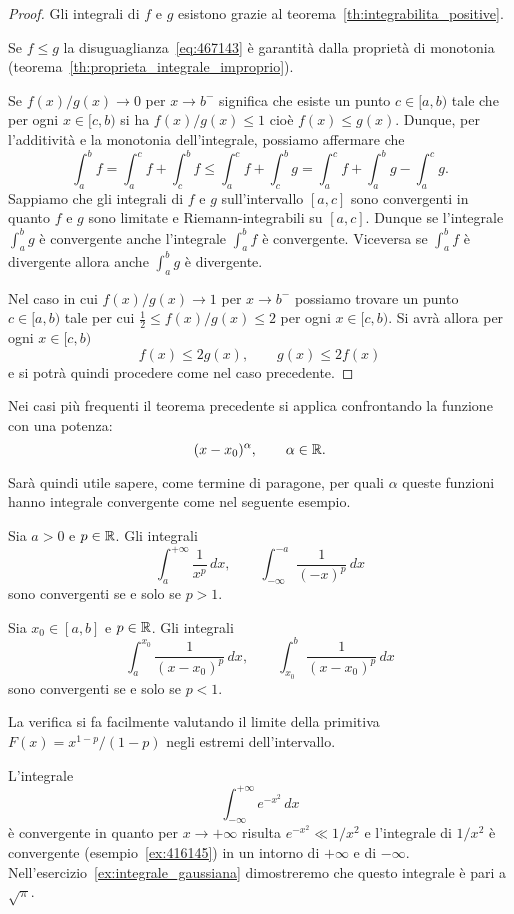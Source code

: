 \begin{proof}
\mymark{**}
Gli integrali di $f$ e $g$ esistono grazie al teorema~\ref{th:integrabilita_positive}.

Se $f\le g$ la disuguaglianza~\eqref{eq:467143} è garantità dalla proprietà di monotonia
(teorema~\ref{th:proprieta_integrale_improprio}).

Se $f(x)/g(x) \to 0$ per $x\to b^-$ significa che esiste un punto $c\in[a,b)$
tale che per ogni $x\in [c,b)$ si ha $f(x)/g(x)\le 1$ cioè $f(x)\le g(x)$.
Dunque, per l'additività e la monotonia dell'integrale, possiamo affermare che
\[
  \int_a^b f
  = \int_a^c f + \int_c^b f
  \le \int_a^c f + \int_c^b g
  = \int_a^c f + \int_a^b g - \int_a^c g.
\]
Sappiamo che gli integrali di $f$ e $g$ sull'intervallo
$[a,c]$ sono convergenti in quanto $f$ e $g$ sono
limitate e Riemann-integrabili su $[a,c]$.
Dunque se l'integrale $\int_a^b g$ è convergente anche l'integrale
$\int_a^b f$ è convergente.
Viceversa se $\int_a^b f$ è divergente allora anche $\int_a^b g$ è divergente.

Nel caso in cui $f(x)/g(x)\to 1$ per $x\to b^-$ possiamo trovare
un punto $c\in[a,b)$ tale per cui $\frac 1 2 \le f(x)/g(x) \le 2$
per ogni $x\in [c,b)$. Si avrà allora per ogni $x\in [c,b)$
\[
f(x) \le 2g(x), \qquad g(x) \le 2 f(x)
\]
e si potrà quindi procedere come nel caso precedente.
\end{proof}

Nei casi più frequenti il teorema precedente si applica confrontando la funzione con una potenza:
\[
  (x-x_0)^\alpha, \qquad \alpha \in {\mathbb R}.
\]

Sarà quindi utile sapere, come termine di paragone,
per quali $\alpha$ queste funzioni hanno integrale convergente
come nel seguente esempio.

\begin{example}
\label{ex:416145}%
\mymark{***}%
Sia $a>0$ e $p\in {\mathbb R}$. Gli integrali
\[
  \int_{a}^{+\infty}\frac{1}{x^p}\, dx,
  \qquad
  \int_{-\infty}^{-a}\frac{1}{(-x)^p}\, dx
\]
sono convergenti se e solo se $p>1$.

Sia $x_0\in [a,b]$ e $p\in{\mathbb R}$.
Gli integrali
\[
  \int_a^{x_0} \frac{1}{(x-x_0)^p}\, dx,
  \qquad
  \int_{x_0}^b \frac{1}{(x-x_0)^p}\, dx
\]
sono convergenti se e solo se $p<1$.

La verifica si fa facilmente valutando il limite della primitiva
$F(x) = x^{1-p}/(1-p)$ negli estremi dell'intervallo.
\end{example}

\begin{example}
%
%
%
L'integrale
\[
 \int_{-\infty}^{+\infty}e^{-x^2}\, dx
\]
è convergente in quanto per $x\to +\infty$ risulta $e^{-x^2} \ll 1/x^2$
e l'integrale di $1/x^2$ è convergente (esempio~\ref{ex:416145})
in un intorno di $+\infty$ e di $-\infty$.
Nell'esercizio~\ref{ex:integrale_gaussiana} dimostreremo 
che questo integrale è pari a $\sqrt \pi$.
\end{example}


